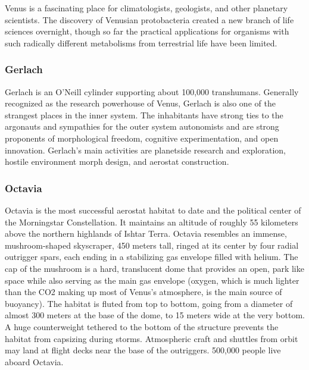 Venus is a fascinating place for climatologists, geologists, and other planetary scientists. The discovery of Venusian protobacteria created a new branch of life sciences overnight, though so far the practical applications for organisms with such radically different metabolisms from terrestrial life have been limited. 

\subsubsection{Gerlach} \label{sec:gerlach} 

Gerlach is an O'Neill cylinder supporting about 100,000 transhumans. Generally recognized as the research powerhouse of Venus, Gerlach is also one of the strangest places in the inner system. The inhabitants have strong ties to the argonauts and sympathies for the outer system autonomists and are strong proponents of morphological freedom, cognitive experimentation, and open innovation. Gerlach's main activities are planetside research and exploration, hostile environment morph design, and aerostat construction. 

\subsubsection{Octavia} \label{sec:octavia} 

Octavia is the most successful aerostat habitat to date and the political center of the Morningstar Constellation. It maintains an altitude of roughly 55 kilometers above the northern highlands of Ishtar Terra. Octavia resembles an immense, mushroom-shaped skyscraper, 450 meters tall, ringed at its center by four radial outrigger spars, each ending in a stabilizing gas envelope filled with helium. The cap of the mushroom is a hard, translucent dome that provides an open, park like space while also serving as the main gas envelope (oxygen, which is much lighter than the CO2 making up most of Venus's atmosphere, is the main source of buoyancy). The habitat is fluted from top to bottom, going from a diameter of almost 300 meters at the base of the dome, to 15 meters wide at the very bottom. A huge counterweight tethered to the bottom of the structure prevents the habitat from capsizing during storms. Atmospheric craft and shuttles from orbit may land at flight decks near the base of the outriggers. 500,000 people live aboard Octavia. 

